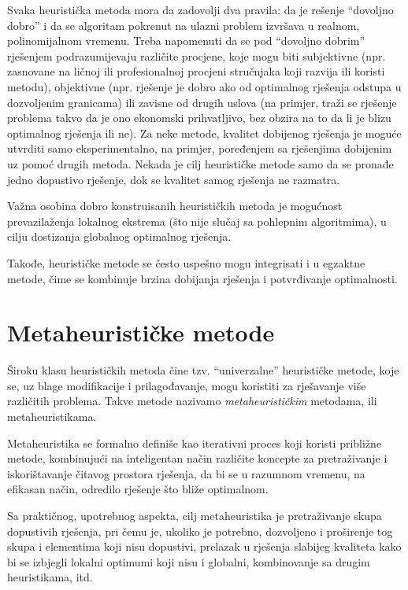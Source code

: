 \documentclass[a4paper, utf8, 11pt, colorlinks]{book}
\theoremstyle{definition}
\begin{document}
 
 Svaka heuristička metoda mora da zadovolji dva pravila: da je rešenje ``dovoljno
 dobro'' i da se algoritam pokrenut na ulazni problem izvršava u realnom, polinomijalnom vremenu. Treba napomenuti da se pod  ``dovoljno
 dobrim'' rješenjem podrazumijevaju različite procjene, koje mogu biti subjektivne (npr. zasnovane na ličnoj ili profesionalnoj procjeni stručnjaka koji razvija ili koristi metodu), objektivne (npr.  rješenje je dobro ako od optimalnog rješenja odstupa u dozvoljenim granicama) ili zavisne od drugih uslova (na primjer, traži se rješenje problema takvo da je ono ekonomski prihvatljivo, bez obzira na to da li je blizu optimalnog rješenja ili ne). 
 Za neke metode, kvalitet dobijenog rješenja je moguće utvrditi samo eksperimentalno, na primjer, poređenjem sa rješenjima dobijenim uz pomoć drugih metoda. Nekada je cilj heurističke metode samo da se pronađe jedno dopustivo rješenje, dok se kvalitet samog rješenja ne razmatra.
 
 Važna osobina dobro konstruisanih heurističkih metoda je mogućnost prevazilaženja lokalnog ekstrema (što nije slučaj sa pohlepnim algoritmima), u cilju dostizanja globalnog optimalnog rješenja. 
 
 Takođe, heurističke metode se često uspešno mogu integrisati i u egzaktne metode, čime se kombinuje brzina dobijanja rješenja i potvrđivanje optimalnosti.
 
 \section{Metaheurističke metode}
 
 Široku klasu heurističkih metoda čine tzv. ``univerzalne'' heurističke metode, koje se, uz blage modifikacije i prilagođavanje, mogu koristiti za rješavanje više različitih problema. Takve metode nazivamo \emph{metaheurističkim} metodama, ili metaheuristikama.  
 
 Metaheuristika se formalno definiše kao iterativni proces koji koristi približne metode, kombinujući na inteligentan način različite koncepte za pretraživanje i iskorištavanje čitavog prostora rješenja, da bi se u razumnom vremenu, na efikasan način, odredilo rješenje što bliže optimalnom.
 
 Sa praktičnog, upotrebnog aspekta, cilj metaheuristika je pretraživanje skupa dopustivih rješenja, pri čemu je, ukoliko je potrebno, dozvoljeno i proširenje tog skupa i elementima koji nisu dopustivi, prelazak u rješenja slabijeg kvali\-teta kako bi se izbjegli lokalni optimumi koji nisu i globalni, kombinovanje sa drugim heuristikama, itd.
 
\end{document}
